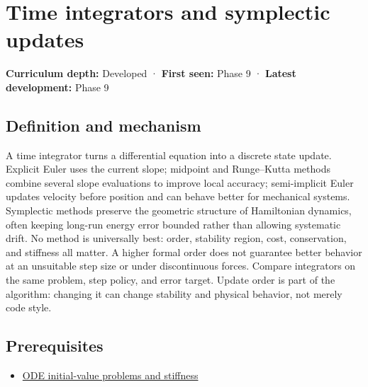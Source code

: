 \hypertarget{appendix-8f96f9c4d5bc}{}\label{referencestart:appendix-8f96f9c4d5bc}
\section{Time integrators and symplectic updates}\label{appendix-8f96f9c4d5bc-time-integrators-and-symplectic-updates}

\hypertarget{appendix-8f96f9c4d5bc-time-integrators-and-symplectic-updates}{}

\textbf{Curriculum depth:} Developed · \textbf{First seen:} Phase 9 · \textbf{Latest development:} Phase 9

\begin{allmightroledefinition}

\subsection{Definition and mechanism}\label{appendix-8f96f9c4d5bc-definition-and-mechanism}

\hypertarget{appendix-8f96f9c4d5bc-definition-and-mechanism}{}

A time integrator turns a differential equation into a discrete state update. Explicit Euler uses the current slope; midpoint and Runge--Kutta methods combine several slope evaluations to improve local accuracy; semi-implicit Euler updates velocity before position and can behave better for mechanical systems. Symplectic methods preserve the geometric structure of Hamiltonian dynamics, often keeping long-run energy error bounded rather than allowing systematic drift. No method is universally best: order, stability region, cost, conservation, and stiffness all matter. A higher formal order does not guarantee better behavior at an unsuitable step size or under discontinuous forces. Compare integrators on the same problem, step policy, and error target. Update order is part of the algorithm: changing it can change stability and physical behavior, not merely code style.

\end{allmightroledefinition}

\subsection{Prerequisites}\label{appendix-8f96f9c4d5bc-prerequisites}

\hypertarget{appendix-8f96f9c4d5bc-prerequisites}{}

\begin{itemize}
\tightlist
\item
  \hyperref[appendix-e8ab9836882e]{ODE initial-value problems and stiffness}
\end{itemize}

